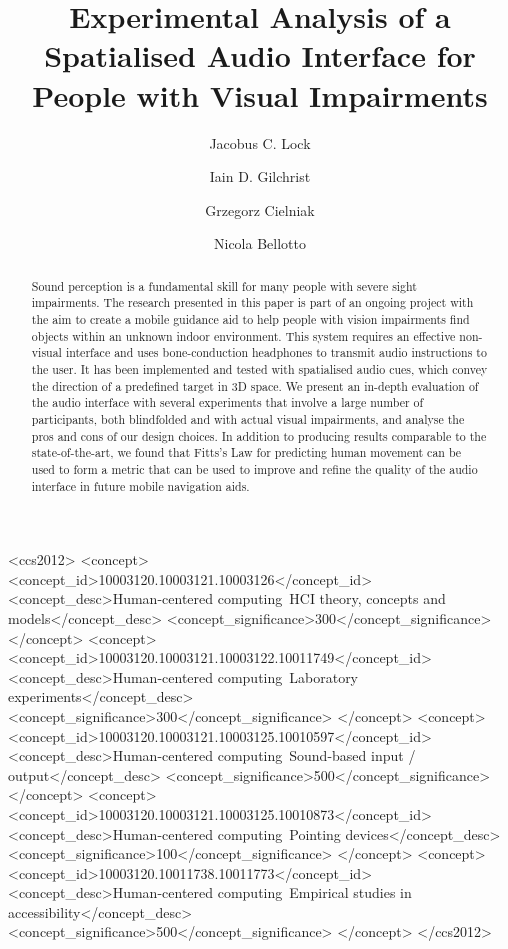 \documentclass[acmsmall]{acmart}
\begin{document}
\title{Experimental Analysis of a Spatialised Audio Interface for People with Visual Impairments}

\author{Jacobus C. Lock}

\author{Iain D. Gilchrist}

\author{Grzegorz Cielniak}

\author{Nicola Bellotto}

\begin{abstract}
  Sound perception is a fundamental skill for many people with severe sight impairments.
  The research presented in this paper is part of an ongoing project with the aim to create a mobile guidance aid to help people with vision impairments find objects within an unknown indoor environment.
  This system requires an effective non-visual interface and uses bone-conduction headphones to transmit audio instructions to the user.
  It has been implemented and tested with spatialised audio cues, which convey the direction of a predefined target in 3D space.
  We present an in-depth evaluation of the audio interface with several experiments that involve a large number of participants, both blindfolded and with actual visual impairments, and analyse the pros and cons of our design choices.
  In addition to producing results comparable to the state-of-the-art, we found that Fitts's Law for predicting human movement can be used to form a metric that can be used to improve and refine the quality of the audio interface in future mobile navigation aids. 
\end{abstract}

\begin{CCSXML}
<ccs2012>
<concept>
<concept_id>10003120.10003121.10003126</concept_id>
<concept_desc>Human-centered computing~HCI theory, concepts and models</concept_desc>
<concept_significance>300</concept_significance>
</concept>
<concept>
<concept_id>10003120.10003121.10003122.10011749</concept_id>
<concept_desc>Human-centered computing~Laboratory experiments</concept_desc>
<concept_significance>300</concept_significance>
</concept>
<concept>
<concept_id>10003120.10003121.10003125.10010597</concept_id>
<concept_desc>Human-centered computing~Sound-based input / output</concept_desc>
<concept_significance>500</concept_significance>
</concept>
<concept>
<concept_id>10003120.10003121.10003125.10010873</concept_id>
<concept_desc>Human-centered computing~Pointing devices</concept_desc>
<concept_significance>100</concept_significance>
</concept>
<concept>
<concept_id>10003120.10011738.10011773</concept_id>
<concept_desc>Human-centered computing~Empirical studies in accessibility</concept_desc>
<concept_significance>500</concept_significance>
</concept>
</ccs2012>
\end{CCSXML}
\end{document}
